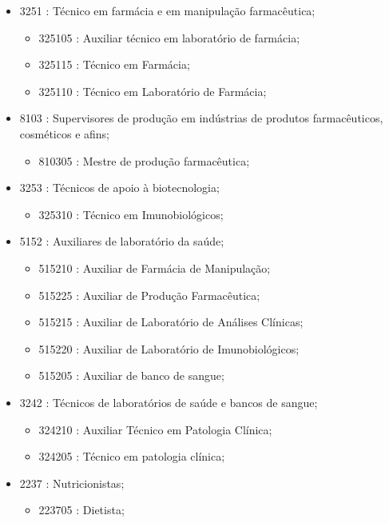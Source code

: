 \begin{itemize}
\begin{itemize}
\begin{itemize}
    \end{itemize}
    \item 3251 : Técnico em farmácia e em manipulação farmacêutica;
    \begin{itemize}
      \item 325105 : Auxiliar técnico em laboratório de farmácia;
      \item 325115 : Técnico em Farmácia;
      \item 325110 : Técnico em Laboratório de Farmácia;
    \end{itemize}
    \item 8103 : Supervisores de produção em indústrias de produtos farmacêuticos, cosméticos e afins;
    \begin{itemize}
      \item 810305 : Mestre de produção farmacêutica;
    \end{itemize}
    \item 3253 : Técnicos de apoio à biotecnologia;
    \begin{itemize}
      \item 325310 : Técnico em Imunobiológicos;
    \end{itemize}
    \item 5152 : Auxiliares de laboratório da saúde;
    \begin{itemize}
      \item 515210 : Auxiliar de Farmácia de Manipulação;
      \item 515225 : Auxiliar de Produção Farmacêutica;
      \item 515215 : Auxiliar de Laboratório de Análises Clínicas;
      \item 515220 : Auxiliar de Laboratório de Imunobiológicos;
      \item 515205 : Auxiliar de banco de sangue;
    \end{itemize}
    \item 3242 : Técnicos de laboratórios de saúde e bancos de sangue;
    \begin{itemize}
      \item 324210 : Auxiliar Técnico em Patologia Clínica;
      \item 324205 : Técnico em patologia clínica;
    \end{itemize}
    \item 2237 : Nutricionistas;
    \begin{itemize}
      \item 223705 : Dietista;
    \end{itemize}

\end{itemize}
\end{itemize}
